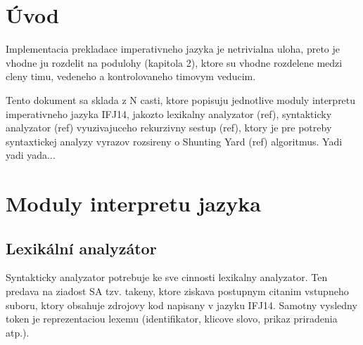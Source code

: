 \documentclass[12pt,a4paper,titlepage,final]{article}
\begin{document}

\def\author{xxx}
\def\email{xxx@stud.fit.vutbr.cz}
\def\projname{Implementace interpretu imperativního jazyka IFJ12}



\pagestyle{plain}
\setcounter{page}{1}
\tableofcontents

\newpage
\pagestyle{plain}
\setcounter{page}{1}

\section{Úvod} \label{uvod}
Implementacia prekladace imperativneho jazyka je netrivialna uloha, preto je
vhodne ju rozdelit na podulohy (kapitola 2), ktore su vhodne rozdelene medzi
cleny timu, vedeneho a kontrolovaneho timovym veducim.

Tento dokument sa sklada z N casti, ktore popisuju jednotlive moduly
interpretu imperativneho jazyka IFJ14, jakozto lexikalny analyzator (ref),
syntakticky analyzator (ref) vyuzivajuceho rekurzivny sestup (ref), ktory je
pre potreby syntaxtickej analyzy vyrazov rozsireny o Shunting Yard (ref)
algoritmus.
Yadi yadi yada...

\section{Moduly interpretu jazyka} \label{moduly_interpretu}
\subsection{Lexikální analyzátor} \label{lexikalni_analyzator}

Syntakticky analyzator potrebuje ke sve cinnosti lexikalny analyzator. Ten
predava na ziadost SA tzv. takeny, ktore ziskava postupnym citanim vstupneho
suboru, ktory obsahuje zdrojovy kod napisany v jazyku IFJ14.
Samotny vysledny token je reprezentaciou lexemu (identifikator, klicove slovo,
prikaz priradenia atp.).
\end{document}
